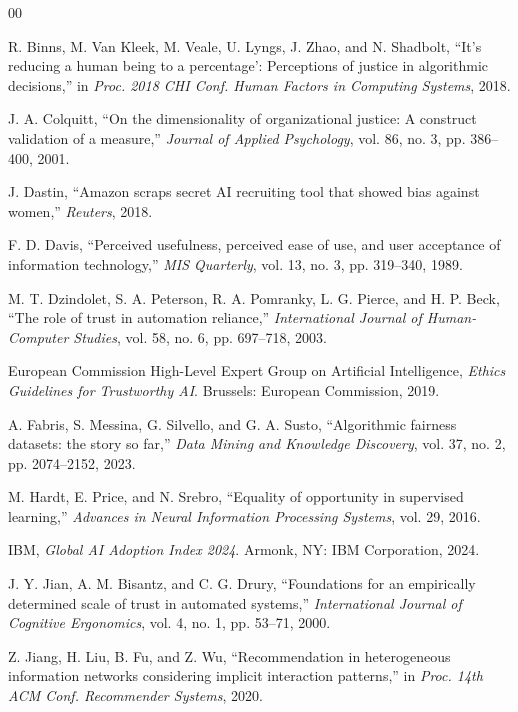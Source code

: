\documentclass[conference]{IEEEtran}
\begin{document}
\begin{thebibliography}{00}

 R. Binns, M. Van Kleek, M. Veale, U. Lyngs, J. Zhao, and N. Shadbolt, ``It's reducing a human being to a percentage': Perceptions of justice in algorithmic decisions,'' in \textit{Proc. 2018 CHI Conf. Human Factors in Computing Systems}, 2018.

 J. A. Colquitt, ``On the dimensionality of organizational justice: A construct validation of a measure,'' \textit{Journal of Applied Psychology}, vol. 86, no. 3, pp. 386--400, 2001.

 J. Dastin, ``Amazon scraps secret AI recruiting tool that showed bias against women,'' \textit{Reuters}, 2018.

 F. D. Davis, ``Perceived usefulness, perceived ease of use, and user acceptance of information technology,'' \textit{MIS Quarterly}, vol. 13, no. 3, pp. 319--340, 1989.

 M. T. Dzindolet, S. A. Peterson, R. A. Pomranky, L. G. Pierce, and H. P. Beck, ``The role of trust in automation reliance,'' \textit{International Journal of Human-Computer Studies}, vol. 58, no. 6, pp. 697--718, 2003.

 European Commission High-Level Expert Group on Artificial Intelligence, \textit{Ethics Guidelines for Trustworthy AI}. Brussels: European Commission, 2019.

 A. Fabris, S. Messina, G. Silvello, and G. A. Susto, ``Algorithmic fairness datasets: the story so far,'' \textit{Data Mining and Knowledge Discovery}, vol. 37, no. 2, pp. 2074--2152, 2023.

 M. Hardt, E. Price, and N. Srebro, ``Equality of opportunity in supervised learning,'' \textit{Advances in Neural Information Processing Systems}, vol. 29, 2016.

 IBM, \textit{Global AI Adoption Index 2024}. Armonk, NY: IBM Corporation, 2024.

 J. Y. Jian, A. M. Bisantz, and C. G. Drury, ``Foundations for an empirically determined scale of trust in automated systems,'' \textit{International Journal of Cognitive Ergonomics}, vol. 4, no. 1, pp. 53--71, 2000.

 Z. Jiang, H. Liu, B. Fu, and Z. Wu, ``Recommendation in heterogeneous information networks considering implicit interaction patterns,'' in \textit{Proc. 14th ACM Conf. Recommender Systems}, 2020.


\end{thebibliography}
\end{document}
